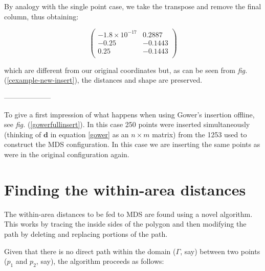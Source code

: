 \documentclass[a4paper,10pt]{amsart}
\newcommand{\fig}[1]{\emph{fig.} (\ref{#1})}
\newcommand{\cross}{\times}
\begin{document}
By analogy with the single point case, we take the transpose and remove the final column, thus obtaining:

\begin{equation}
\begin{pmatrix}
-1.8\cross 10^{-17} &  0.2887\\
-0.25 & -0.1443\\
 0.25 & -0.1443\\
\end{pmatrix}
\end{equation}

which are different from our original coordinates but, as can be seen from \fig{cexample-new-insert}, the distances and shape are preserved.


--------------------

To give a first impression of what happens when using Gower's insertion offline, see \fig{gowerfullinsert}. In this case 250 points were inserted simultaneously (thinking of $\mathbf{d}$ in equation \ref{gower} as an $n \cross m$ matrix) from the 1253 used to construct the MDS configuration. In this case we are inserting the same points as were in the original configuration again.










\section{Finding the within-area distances}

The within-area distances to be fed to MDS are found using a novel algorithm. This works by tracing the inside sides of the polygon and then modifying the path by deleting and replacing portions of the path. 

Given that there is no direct path within the domain ($\Gamma$, say) between two points ($p_1$ and $p_2$, say), the algorithm proceeds as follows:
\end{document}
